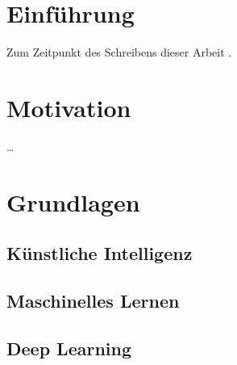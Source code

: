 \documentclass[12pt,a4paper]{article}
\begin{document}
\newpage
{}
\acresetall

%
%
%

\section{Einführung}
Zum Zeitpunkt des Schreibens dieser Arbeit \parencite[vgl.][]{assembly_in_dotnet}.\cite[vgl.][]{csharp_5.0_in_a_nutshell_page_3_to_5}

\section{Motivation}
\dots

\section{Grundlagen}
\subsection{Künstliche Intelligenz}
\subsection{Maschinelles Lernen}
\subsection{Deep Learning}
\end{document}
